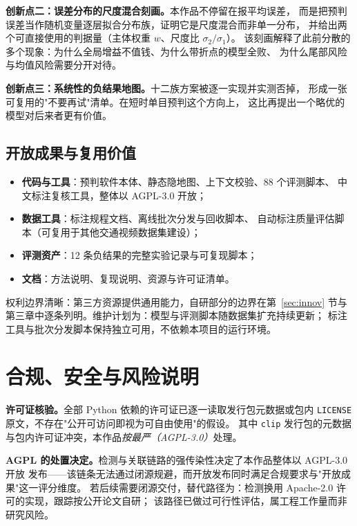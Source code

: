 \documentclass[11pt,a4paper]{ctexart}
\begin{document}
\textbf{创新点二：误差分布的尺度混合刻画。}本作品不停留在报平均误差，
而是把预判误差当作随机变量逐层拟合分布族，证明它是尺度混合而非单一分布，
并给出两个可直接使用的判据量（主体权重 $w$、尺度比 $\sigma_2/\sigma_1$）。
该刻画解释了此前分散的多个现象：为什么全局增益不值钱、为什么带折点的模型全败、
为什么尾部风险与均值风险需要分开对待。

\textbf{创新点三：系统性的负结果地图。}十二族方案被逐一实现并实测否掉，
形成一张可复用的"不要再试"清单。在短时单目预判这个方向上，
这比再提出一个略优的模型对后来者更有价值。

\subsection{开放成果与复用价值}

\begin{itemize}\setlength{\itemsep}{1pt}
  \item \textbf{代码与工具}：预判软件本体、静态隐地图、上下文校验、88 个评测脚本、
        中文标注复核工具，整体以 AGPL-3.0 开放；
  \item \textbf{数据工具}：标注规程文档、离线批次分发与回收脚本、
        自动标注质量评估脚本（可复用于其他交通视频数据集建设）；
  \item \textbf{评测资产}：12 条负结果的完整实验记录与可复现脚本；
  \item \textbf{文档}：方法说明、复现说明、资源与许可证清单。
\end{itemize}

权利边界清晰：第三方资源提供通用能力，自研部分的边界在第~\ref{sec:innov} 节与
第三章中逐条列明。维护计划为：模型与评测脚本随数据集扩充持续更新；
标注工具与批次分发脚本保持独立可用，不依赖本项目的运行环境。

\section{合规、安全与风险说明}

\textbf{许可证核验。}全部 Python 依赖的许可证已逐一读取发行包元数据或包内
\texttt{LICENSE} 原文，不存在"公开可访问即视为可自由使用"的假设。
其中 \texttt{clip} 发行包的元数据与包内许可证冲突，本作品\emph{按最严（AGPL-3.0）}处理。

\textbf{AGPL 的处置决定。}检测与关联链路的强传染性决定了本作品整体以 AGPL-3.0 开放
发布——该链条无法通过闭源规避，而开放发布同时满足合规要求与"开放成果"这一评分维度。
若后续需要闭源交付，替代路径为：检测换用 Apache-2.0 许可的实现，跟踪按公开论文自研；
该路径已做过可行性评估，属工程工作量而非研究风险。
\end{document}
